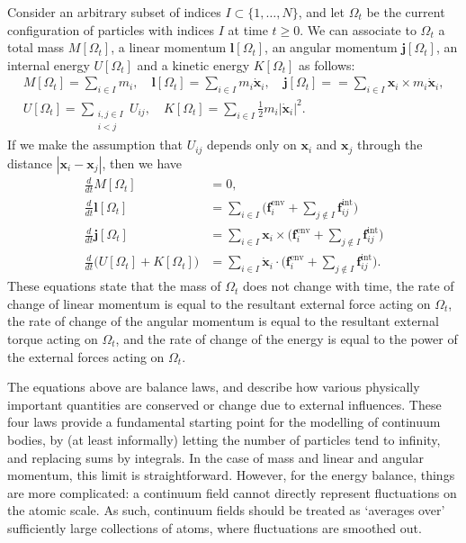 \documentclass[
  letterpaper,
  DIV=11,
  numbers=noendperiod]{scrreprt}
\theoremstyle{plain}
\theoremstyle{remark}
\begin{document}
Consider an arbitrary subset of indices \(I\subset\{1,\ldots,N\}\), and
let \(\Omega_t\) be the current configuration of particles with indices
\(I\) at time \(t\geq 0\). We can associate to \(\Omega_t\) a total mass
\(M[\Omega_t]\), a linear momentum \({\boldsymbol{l}}[\Omega_t]\), an
angular momentum \({\boldsymbol{j}}[\Omega_t]\), an internal energy
\(U[\Omega_t]\) and a kinetic energy \(K[\Omega_t]\) as follows:
\[\begin{gathered}
    M[\Omega_t] = \sum_{i\in I}m_i,\quad{\boldsymbol{l}}[\Omega_t] = \sum_{i\in I}m_i\dot{{\boldsymbol{x}}}_i,\quad {\boldsymbol{j}}[\Omega_t] = = \sum_{i\in I}{\boldsymbol{x}}_i\times m_i\dot{{\boldsymbol{x}}}_i,\\
    U[\Omega_t] = \sum_{\substack{i,j\in I\\i<j}} U_{ij},\quad K[\Omega_t] = \sum_{i\in I} \tfrac12m_i|\dot{{\boldsymbol{x}}}_i|^2.
  \end{gathered}\] If we make the assumption that \(U_{ij}\) depends
only on \({\boldsymbol{x}}_i\) and \({\boldsymbol{x}}_j\) through the
distance \(|{\boldsymbol{x}}_i-{\boldsymbol{x}}_j|\), then we have
\[\begin{aligned}
  \frac{d}{dt}M[\Omega_t] &= 0,\\
  \frac{d}{dt}{\boldsymbol{l}}[\Omega_t] &= \sum_{i\in I}\bigg({\boldsymbol{f}}^{\text{env}}_i+\sum_{j\notin I}{\boldsymbol{f}}^{\text{int}}_{ij}\bigg)\\
  \frac{d}{dt}{\boldsymbol{j}}[\Omega_t] &= \sum_{i\in I}{\boldsymbol{x}}_i\times \bigg({\boldsymbol{f}}^{\text{env}}_i+\sum_{j\notin I}{\boldsymbol{f}}^{\text{int}}_{ij}\bigg)\\
  \frac{d}{dt}\big(U[\Omega_t]+K[\Omega_t]\big) &= \sum_{i\in I} \dot{{\boldsymbol{x}}}_i\cdot \bigg({\boldsymbol{f}}^{\text{env}}_i+\sum_{j\notin I}{\boldsymbol{f}}^{\text{int}}_{ij}\bigg).
\end{aligned}\] These equations state that the mass of \(\Omega_t\) does
not change with time, the rate of change of linear momentum is equal to
the resultant external force acting on \(\Omega_t\), the rate of change
of the angular momentum is equal to the resultant external torque acting
on \(\Omega_t\), and the rate of change of the energy is equal to the
power of the external forces acting on \(\Omega_t\).

The equations above are balance laws, and describe how various
physically important quantities are conserved or change due to external
influences. These four laws provide a fundamental starting point for the
modelling of continuum bodies, by (at least informally) letting the
number of particles tend to infinity, and replacing sums by integrals.
In the case of mass and linear and angular momentum, this limit is
straightforward. However, for the energy balance, things are more
complicated: a continuum field cannot directly represent fluctuations on
the atomic scale. As such, continuum fields should be treated as
`averages over' sufficiently large collections of atoms, where
fluctuations are smoothed out.
\end{document}
